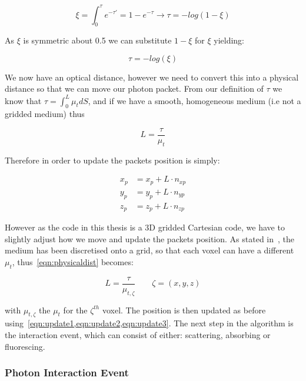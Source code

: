 \begin{equation}
\xi=\int_{0}^{\tau}e^{-\tau'}=1-e^{-\tau}\rightarrow \tau=-log(1-\xi)
\end{equation}

As $\xi$ is symmetric about 0.5 we can substitute $1-\xi$ for $\xi$ yielding:

\begin{equation}
\tau=-log(\xi)\label{eqn:taueqn}
\end{equation} 

We now have an optical distance, however we need to convert this into a physical distance so that we can move our photon packet. From our definition of $\tau$ we know that $\tau=\int_0^L\mu_tdS$, and if we have a smooth, homogeneous medium (i.e not a gridded medium) thus 

\begin{equation}
L=\frac{\tau}{\mu_t}\label{eqn:physicaldist}
\end{equation}

Therefore in order to update the packets position is simply:

\begin{align}
x_p &= x_p+L\cdot n_{xp}\label{eqn:update1}\\
y_p &= y_p+L\cdot n_{yp}\label{eqn:update2}\\
z_p &= z_p+L\cdot n_{zp}\label{eqn:update3}
\end{align}

However as the code in this thesis is a 3D gridded Cartesian code, we have to slightly adjust how we move and update the packets position. As stated in~, the medium has been discretised onto a grid, so that each voxel can have a different $\mu_t$, thus~\cref{eqn:physicaldist} becomes:

\begin{equation}
L=\frac{\tau}{\mu_{t,\zeta}}\quad\quad \zeta=(x,y,z)
\end{equation}

with $\mu_{t,\zeta}$ the $\mu_t$ for the $\zeta^{th}$ voxel. The position is then updated as before using~\cref{eqn:update1,eqn:update2,eqn:update3}. The next step in the algorithm is the interaction event, which can consist of either: scattering, absorbing or fluorescing. 

\subsubsection*{Photon Interaction Event}\label{sec:photscatterabsorb}

